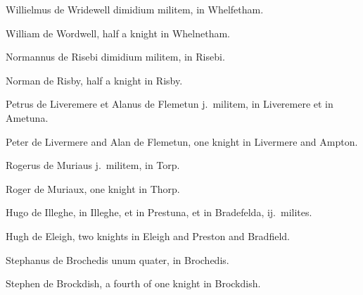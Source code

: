 \documentclass{book}
\begin{document}
\begin{paracol}{2}
\switchcolumn*

\begin{otherlanguage}{latin}
Willielmus de Wridewell dimidium militem, in Whelfetham.
\end{otherlanguage}

\switchcolumn

William de Wordwell, half a knight in Whelnetham.

\switchcolumn*

\begin{otherlanguage}{latin}
Normannus de Risebi dimidium militem, in Risebi.
\end{otherlanguage}

\switchcolumn

Norman de Risby, half a knight in Risby.

\switchcolumn*

\begin{otherlanguage}{latin}
Petrus de Liveremere et Alanus de Flemetun j.\ militem, in Liveremere et in Ametuna.
\end{otherlanguage}

\switchcolumn

Peter de Livermere and Alan de Flemetun, one knight in Livermere and Ampton.

\switchcolumn*

\begin{otherlanguage}{latin}
Rogerus de Muriaus j.\ militem, in Torp.
\end{otherlanguage}

\switchcolumn

Roger de Muriaux, one knight in Thorp.

\switchcolumn*

\begin{otherlanguage}{latin}
Hugo de Illeghe, in Illeghe, et in Prestuna, et in Bradefelda, ij.\ milites.
\end{otherlanguage}

\switchcolumn

Hugh de Eleigh, two knights in Eleigh and Preston and Bradfield.

\switchcolumn*

\begin{otherlanguage}{latin}
Stephanus de Brochedis unum quater, in Brochedis.
\end{otherlanguage}

\switchcolumn

Stephen de Brockdish, a fourth of one knight in Brockdish.


\end{paracol}
\end{document}

